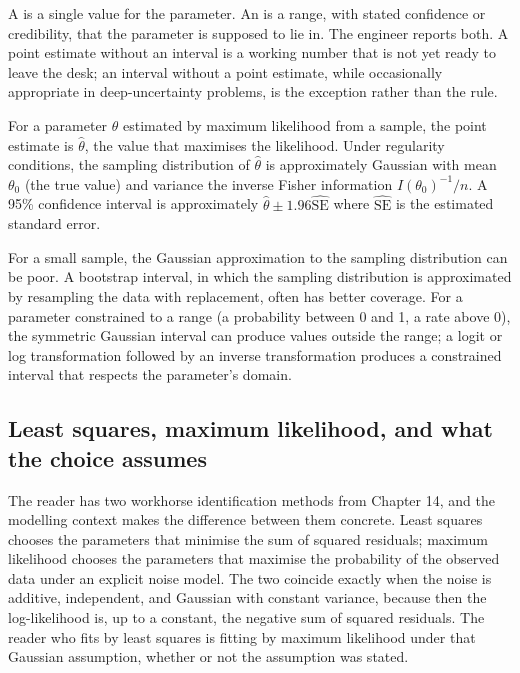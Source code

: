 A  is a single value for the parameter. An
 is a range, with stated confidence or
credibility, that the parameter is supposed to lie in. The
engineer reports both. A point estimate without an interval is a
working number that is not yet ready to leave the desk; an
interval without a point estimate, while occasionally appropriate
in deep-uncertainty problems, is the exception rather than the
rule.

For a parameter $\theta$ estimated by maximum likelihood from a
sample, the point estimate is $\hat\theta$, the value that
maximises the likelihood. Under regularity conditions, the
sampling distribution of $\hat\theta$ is approximately Gaussian
with mean $\theta_{0}$ (the true value) and variance the inverse
Fisher information $I(\theta_{0})^{-1}/n$. A 95\% confidence
interval is approximately $\hat\theta \pm 1.96 \hat{\mathrm{SE}}$
where $\hat{\mathrm{SE}}$ is the estimated standard error.

For a small sample, the Gaussian approximation to the sampling
distribution can be poor. A bootstrap interval, in which the
sampling distribution is approximated by resampling the data with
replacement, often has better coverage. For a parameter
constrained to a range (a probability between 0 and 1, a rate
above 0), the symmetric Gaussian interval can produce values
outside the range; a logit or log transformation followed by an
inverse transformation produces a constrained interval that
respects the parameter's domain.

\subsection{Least squares, maximum likelihood, and what the choice assumes}

The reader has two workhorse identification methods from Chapter 14, and
the modelling context makes the difference between them concrete.
Least squares chooses the parameters that minimise the sum of squared
residuals; maximum likelihood chooses the parameters that maximise the
probability of the observed data under an explicit noise model. The two
coincide exactly when the noise is additive, independent, and Gaussian
with constant variance, because then the log-likelihood is, up to a
constant, the negative sum of squared residuals. The reader who fits by
least squares is fitting by maximum likelihood under that Gaussian
assumption, whether or not the assumption was stated.

